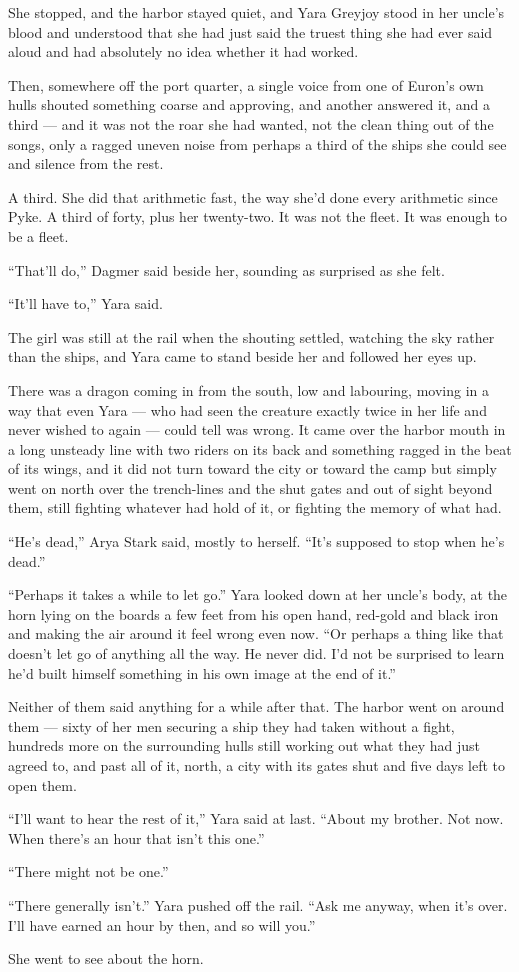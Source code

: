 She stopped, and the harbor stayed quiet, and Yara Greyjoy stood in her uncle’s blood and understood that she had just said the truest thing she had ever said aloud and had absolutely no idea whether it had worked.

Then, somewhere off the port quarter, a single voice from one of Euron’s own hulls shouted something coarse and approving, and another answered it, and a third — and it was not the roar she had wanted, not the clean thing out of the songs, only a ragged uneven noise from perhaps a third of the ships she could see and silence from the rest.

A third. She did that arithmetic fast, the way she’d done every arithmetic since Pyke. A third of forty, plus her twenty-two. It was not the fleet. It was enough to be a fleet.

“That’ll do,” Dagmer said beside her, sounding as surprised as she felt.

“It’ll have to,” Yara said.

\sceneBreak

The girl was still at the rail when the shouting settled, watching the sky rather than the ships, and Yara came to stand beside her and followed her eyes up.

There was a dragon coming in from the south, low and labouring, moving in a way that even Yara — who had seen the creature exactly twice in her life and never wished to again — could tell was wrong. It came over the harbor mouth in a long unsteady line with two riders on its back and something ragged in the beat of its wings, and it did not turn toward the city or toward the camp but simply went on north over the trench-lines and the shut gates and out of sight beyond them, still fighting whatever had hold of it, or fighting the memory of what had.

“He’s dead,” Arya Stark said, mostly to herself. “It’s supposed to stop when he’s dead.”

“Perhaps it takes a while to let go.” Yara looked down at her uncle’s body, at the horn lying on the boards a few feet from his open hand, red-gold and black iron and making the air around it feel wrong even now. “Or perhaps a thing like that doesn’t let go of anything all the way. He never did. I’d not be surprised to learn he’d built himself something in his own image at the end of it.”

Neither of them said anything for a while after that. The harbor went on around them — sixty of her men securing a ship they had taken without a fight, hundreds more on the surrounding hulls still working out what they had just agreed to, and past all of it, north, a city with its gates shut and five days left to open them.

“I’ll want to hear the rest of it,” Yara said at last. “About my brother. Not now. When there’s an hour that isn’t this one.”

“There might not be one.”

“There generally isn’t.” Yara pushed off the rail. “Ask me anyway, when it’s over. I’ll have earned an hour by then, and so will you.”

She went to see about the horn.